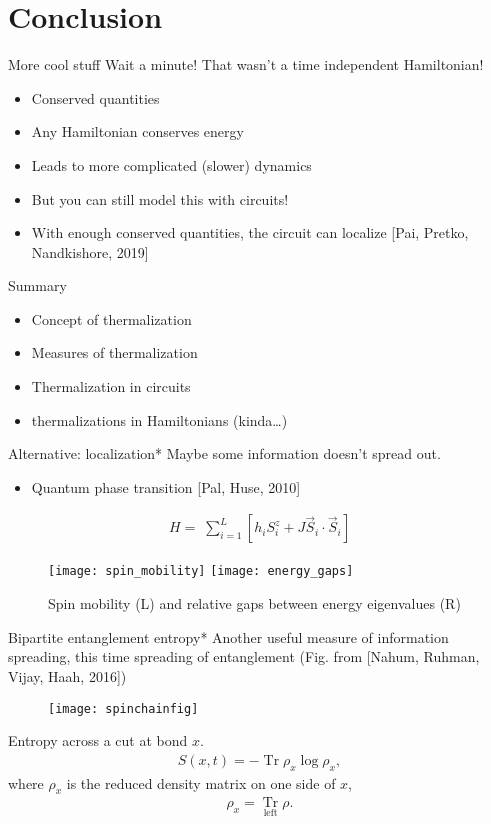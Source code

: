 \documentclass{beamer}
\DeclareMathOperator{\Tr}{Tr}
\begin{document}
\section{Conclusion}

\begin{frame}{More cool stuff}
Wait a minute! That wasn't a time independent Hamiltonian!
\begin{itemize}
	\item Conserved quantities
	\item Any Hamiltonian conserves energy
	\item Leads to more complicated (slower) dynamics
	\item But you can still model this with circuits!
	\item With enough conserved quantities, the circuit can localize [Pai, Pretko, Nandkishore, 2019]
\end{itemize}
\end{frame}

\begin{frame}
Summary
\begin{itemize}
	\item Concept of thermalization
	\item Measures of thermalization
	\item Thermalization in circuits
	\item thermalizations in Hamiltonians (kinda\dots)
\end{itemize}
\end{frame}

\begin{frame}{Alternative: localization*}
Maybe some information doesn't spread out.\\
\begin{itemize}
	\item Quantum phase transition [Pal, Huse, 2010]
\end{itemize}
\begin{align}
H=􏰜\sum_{i=1}^{L}[h_iS_i^z+J\vec{S}_i\cdot\vec{S}_i]\nonumber
\end{align}
\begin{figure}
	\centering
	\texttt{[image: spin\_mobility]}
	\texttt{[image: energy\_gaps]}
	\caption{Spin mobility (L) and relative gaps between energy eigenvalues (R)}
\end{figure}
\end{frame}

\begin{frame}{Bipartite entanglement entropy*}
Another useful measure of information spreading, this time spreading of entanglement (Fig. from [Nahum, Ruhman, Vijay, Haah, 2016])
\begin{figure}
	\centering
	\texttt{[image: spinchainfig]}
\end{figure}
Entropy across a cut at bond $x$.
\begin{align}
S(x,t) = -\Tr \rho_x\log\rho_x,\nonumber
\end{align}
where $\rho_x$ is the reduced density matrix on one side of $x$,
\begin{align}
\rho_x=\Tr\limits_{\text{left}}\rho.\nonumber
\end{align}
\end{frame}
\end{document}
